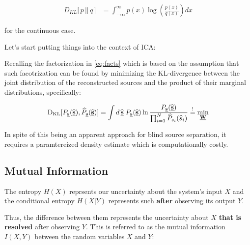 

\begin{align}
\label{eq:klcont}
D_{KL}\lbrack\,p\, ||\, q\,\rbrack 
&= \int_{-\infty}^{\infty} p(x) \log \left( \frac{p(x)}{q(x)} \right) dx
\end{align}

for the continuous case.

\clearpage 
Let's start putting things into the context of ICA:

Recalling the factorization in \eqref{eq:facts} which is based on the assumption that such facotrization can be found by minimizing 
the KL-divergence between the joint distribution of the reconstructed sources and the product of their marginal distributions, specifically:

\begin{equation}
\label{eq:klmin}
	\mathrm{D}_{\mathrm{KL}}[P_{\underline{\mathbf{s}}}(\widehat{\underline{\mathbf{s}}}),\widehat{P}_{\underline{\mathbf{s}}}(\widehat{\underline{\mathbf{s}}})] = 
    \int d \, \widehat{\underline{\mathbf{s}}} \; P_{\underline{\mathbf{s}}}(\widehat{\underline{\mathbf{s}}})
		\ln \frac{P_{\underline{\mathbf{s}}}(\widehat{\underline{\mathbf{s}}})}{
			\prod_{i = 1}^N \widehat{P}_{s_i}(\widehat{s}_i) }
		\stackrel{\mathrm{!}}{=} \min_{\underline{\mathbf{W}}}
\end{equation}

In spite of this being an apparent approach for blind source separation, it requires a paramtereized density estimate which is computationally costly.

\subsection{Mutual Information}

The entropy $H(X)$ reprsents our uncertainty about the system's input $X$ 
and the conditional entropy $H(X|Y)$ represents such \textbf{after} observing its output $Y$.

Thus, the difference between them represents the uncertainty about $X$ \textbf{that is resolved} after observing $Y$. 
This is referred to as the mutual information $I(X,Y)$ between the random variables $X$ and $Y$:


